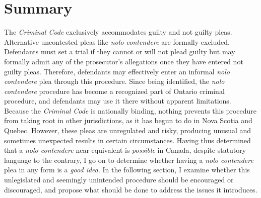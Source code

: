 \section{Summary}

The \textit{Criminal Code} exclusively accommodates guilty and not guilty pleas. Alternative uncontested pleas like \textit{nolo contendere} are formally excluded. Defendants must set a trial if they cannot or will not plead guilty but may formally admit any of the prosecutor's allegations once they have entered not guilty pleas. Therefore, defendants may effectively enter an informal \textit{nolo contendere} plea through this procedure. Since being identified, the \textit{nolo contendere} procedure has become a recognized part of Ontario criminal procedure, and defendants may use it there without apparent limitations. Because the \textit{Criminal Code} is nationally binding, nothing prevents this procedure from taking root in other jurisdictions, as it has begun to do in Nova Scotia and Quebec. However, these pleas are unregulated and risky, producing unusual and sometimes unexpected results in certain circumstances. Having thus determined that a \textit{nolo contendere} near-equivalent is \textit{possible} in Canada, despite statutory language to the contrary, I go on to determine whether having a \textit{nolo contendere} plea in any form is a \textit{good idea}. In the following section, I examine whether this unlegislated and seemingly unintended procedure should be encouraged or discouraged, and propose what should be done to address the issues it introduces.